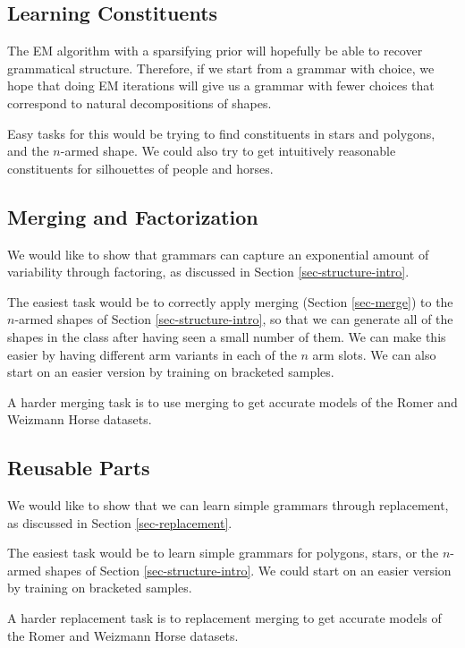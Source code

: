
\subsection{Learning Constituents}

The EM algorithm with a sparsifying prior will hopefully be able to
recover grammatical structure. Therefore, if we start from a grammar
with choice, we hope that doing EM iterations will give us a grammar
with fewer choices that correspond to natural decompositions of
shapes.

Easy tasks for this would be trying to find constituents in stars and
polygons, and the $n$-armed shape. We could also try to get
intuitively reasonable constituents for silhouettes of people and
horses.

\subsection{Merging and Factorization}

We would like to show that grammars can capture an exponential amount
of variability through factoring, as discussed in Section
\ref{sec-structure-intro}.

The easiest task would be to correctly apply merging (Section
\ref{sec-merge}) to the $n$-armed shapes of Section
\ref{sec-structure-intro}, so that we can generate all of the shapes in the
class after having seen a small number of them. We can make this
easier by having different arm variants in each of the $n$ arm
slots. We can also start on an easier version by training on bracketed
samples.

A harder merging task is to use merging to get accurate models of the
Romer and Weizmann Horse datasets.

\subsection{Reusable Parts}

We would like to show that we can learn simple grammars through
replacement, as discussed in Section \ref{sec-replacement}.

The easiest task would be to learn simple grammars for polygons,
stars, or the $n$-armed shapes of Section \ref{sec-structure-intro}. We
could start on an easier version by training on bracketed samples.

A harder replacement task is to replacement merging to get accurate
models of the Romer and Weizmann Horse datasets.

